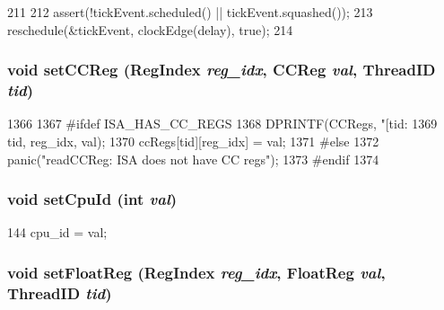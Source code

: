 \begin{DoxyCode}
211     {
212         assert(!tickEvent.scheduled() || tickEvent.squashed());
213         reschedule(&tickEvent, clockEdge(delay), true);
214     }
\end{DoxyCode}
\hypertarget{classInOrderCPU_a54f8b635e27b3a845dd71124a4784951}{
\subsubsection[{setCCReg}]{\setlength{\rightskip}{0pt plus 5cm}void setCCReg ({\bf RegIndex} {\em reg\_\-idx}, \/  {\bf CCReg} {\em val}, \/  {\bf ThreadID} {\em tid})}}
\label{classInOrderCPU_a54f8b635e27b3a845dd71124a4784951}



\begin{DoxyCode}
1366 {
1367 #ifdef ISA_HAS_CC_REGS
1368     DPRINTF(CCRegs, "[tid:%
1369             tid, reg_idx, val);
1370     ccRegs[tid][reg_idx] = val;
1371 #else
1372     panic("readCCReg: ISA does not have CC regs\n");
1373 #endif
1374 }
\end{DoxyCode}
\hypertarget{classInOrderCPU_afb191a3765c6e41fbaf116d196312ad8}{
\subsubsection[{setCpuId}]{\setlength{\rightskip}{0pt plus 5cm}void setCpuId (int {\em val})}}
\label{classInOrderCPU_afb191a3765c6e41fbaf116d196312ad8}



\begin{DoxyCode}
144 { cpu_id = val; }
\end{DoxyCode}
\hypertarget{classInOrderCPU_a60a2b6d8c0ac76cc653e44d1f228e173}{
\subsubsection[{setFloatReg}]{\setlength{\rightskip}{0pt plus 5cm}void setFloatReg ({\bf RegIndex} {\em reg\_\-idx}, \/  {\bf FloatReg} {\em val}, \/  {\bf ThreadID} {\em tid})}}
\label{classInOrderCPU_a60a2b6d8c0ac76cc653e44d1f228e173}



